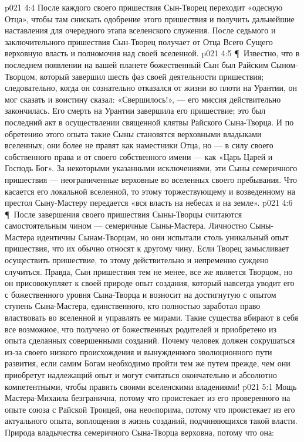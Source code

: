 \vs p021 4:4 После каждого своего пришествия Сын\hyp{}Творец переходит «одесную Отца», чтобы там снискать одобрение этого пришествия и получить дальнейшие наставления для очередного этапа вселенского служения. После седьмого и заключительного пришествия Сын\hyp{}Творец получает от Отца Всего Сущего верховную власть и полномочия над своей вселенной.
\vs p021 4:5 \P\ Известно, что в последнем появлении на вашей планете божественный Сын был Райским Сыном\hyp{}Творцом, который завершил шесть фаз своей деятельности пришествия; следовательно, когда он сознательно отказался от жизни во плоти на Урантии, он мог сказать и воистину сказал: «Свершилось!», --- его миссия действительно закончилась. Его смерть на Урантии завершила его пришествие; это был последний акт в осуществлении священной клятвы Райского Сына\hyp{}Творца. И по обретению этого опыта такие Сыны становятся верховными владыками вселенных; они более не правят как наместники Отца, но --- в силу своего собственного права и от своего собственного имени --- как «Царь Царей и Господь Бог». За некоторыми указанными исключениями, эти Сыны семеричного пришествия --- неограниченные верховные во вселенных своего пребывания. Что касается его локальной вселенной, то этому торжествующему и возведенному на престол Сыну\hyp{}Мастеру передается «вся власть на небесах и на земле».
\vs p021 4:6 \P\ После завершения своего пришествия Сыны\hyp{}Творцы считаются самостоятельным чином --- семеричные Сыны\hyp{}Мастера. Личностно Сыны\hyp{}Мастера идентичны Сынам\hyp{}Творцам, но они испытали столь уникальный опыт пришествия, что их обычно относят к другому чину. Если Творец замысливает осуществить пришествие, то этому действительно и непременно суждено случиться. Правда, Сын пришествия тем не менее, все же является Творцом, но он присовокупляет к своей природе опыт создания, который навсегда уводит его с божественного уровня Сына\hyp{}Творца и возносит на достигнутую с опытом ступень Сына\hyp{}Мастера, единственного, кто полностью заработал право властвовать во вселенной и управлять ее мирами. Такие существа вбирают в себя все возможное, что получено от божественных родителей и приобретено из опыта сделанных совершенными созданий. Почему человек должен сокрушаться из\hyp{}за своего низкого происхождения и вынужденного эволюционного пути развития, если самим Богам необходимо пройти тем же путем прежде, чем они приобретут надлежащий опыт и могут считаться окончательно и абсолютно компетентными, чтобы править своими вселенскими владениями!
\vs p021 5:1 Мощь Мастера\hyp{}Михаила безгранична, потому что проистекает из его проверенного на опыте союза с Райской Троицей, она неоcпорима, потому что проистекает из его актуального опыта, воплощения в жизнь созданий, подчиняющихся такой власти. Природа владычества семеричного Сына\hyp{}Творца верховна, потому что она:
